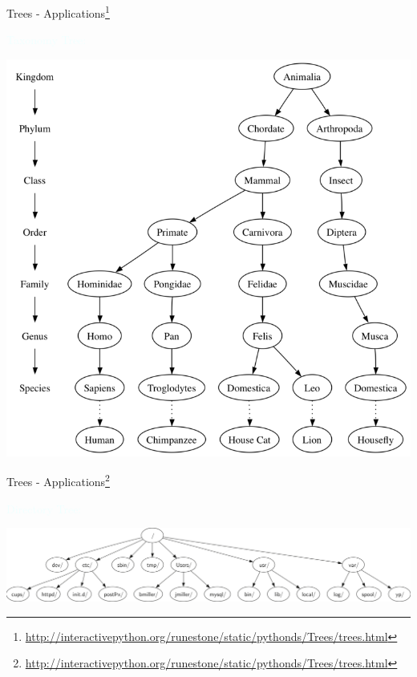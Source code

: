 \documentclass{beamer}
\newcommand{\tblue}[1]{{\Large {\textcolor{azure}{#1}}}}
\begin{document}
\begin{frame}{Trees - Applications\footnote{\url{http://interactivepython.org/runestone/static/pythonds/Trees/trees.html}}}

\tblue{Taxonomy Tree:}
\begin{center}
    \includegraphics[scale=0.4]{treesEg1.png}
\end{center}
\end{frame}


\begin{frame}{Trees - Applications\footnote{\url{http://interactivepython.org/runestone/static/pythonds/Trees/trees.html}}}

\tblue{Directory Tree:}
\begin{center}
    \includegraphics[scale=0.5]{treesEg3.png}
\end{center}
\end{frame}
\end{document}

